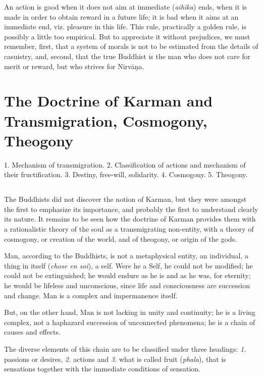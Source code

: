 \documentclass[a4paper, 11pt, oneside, english]{article}
\begin{document}
An action is good when it does not aim at immediate (\emph{aihika}) ends, when it is made in order to obtain reward in a future life; it is bad when it aims at an immediate end, viz. pleasure in this life. This rule, practically a golden rule, is possibly a little too empirical. But to appreciate it without prejudices, we must remember, first, that a system of morals is not to be estimated from the details of casuistry, and, second, that the true Buddhist is the man who does not care for merit or reward, but who strives for Nirvāṇa.
\clearpage
\section{The Doctrine of Karman and Transmigration, Cosmogony, Theogony}
\begin{center}\footnotesize
1. Mechanism of transmigration. 2. Classification of actions and mechanism of their fructification. 3. Destiny, free-will, solidarity. 4. Cosmogony. 5. Theogony.
\end{center}
\subsection{}
\paragraph{}
The Buddhists did not discover the notion of Karman, but they were amongst the first to emphasize its importance, and probably the first to understand clearly its nature. It remains to be seen how the doctrine of Karman provides them with a rationalistic theory of the soul as a transmigrating non-entity, with a theory of cosmogony, or creation of the world, and of theogony, or origin of the gods.

Man, according to the Buddhists, is not a metaphysical entity, an individual, a thing in itself (\emph{chose en soi}), a self. Were he a Self, he could not be modified; he could not be extinguished; he would endure as he is and as he was, for eternity; he would be lifeless and unconscious, since life and consciousness are succession and change. Man is a complex and impermanence itself.

But, on the other hand, Man is not lacking in unity and continuity; he is a living complex, not a haphazard succession of unconnected phenomena; he is a chain of causes and effects.

The diverse elements of this chain are to be classified under three headings: \emph{1.} passions or desires, \emph{2.} actions and \emph{3.} what is called fruit (\emph{phala}), that is sensations together with the immediate conditions of sensation.
\end{document}
